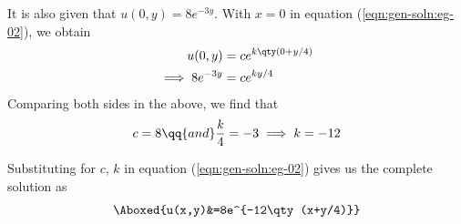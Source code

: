 \begin{enumerate}
            It is also given that $u(0,y)=8e^{-3y}$. With $x=0$ in equation (\ref{eqn:gen-soln:eg-02}), we obtain
            \begin{align*}
                u(0,y)&=ce^{k\qty(0+y/4)} \\
                \implies 8e^{-3y}&=ce^{ky/4}
            \end{align*}
            Comparing both sides in the above, we find that
            \begin{align*}
                c=8\qq{and}\dfrac{k}{4}=-3\implies k=-12
            \end{align*}

            Substituting for $c$, $k$ in equation (\ref{eqn:gen-soln:eg-02}) gives us the complete solution as
            \begin{align*}
                \Aboxed{u(x,y)&=8e^{-12\qty(x+y/4)}}
            \end{align*}
        \end{enumerate}

